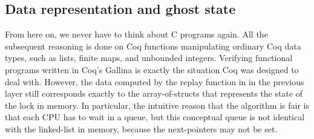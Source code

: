 %
%
%
%
%

\subsection{Data representation and ghost state}
\label{sec:representation-ghost}

From here on, we never have to think about C programs again.  All the
subsequent reasoning is done on Coq functions manipulating ordinary
Coq data types, such as lists, finite maps, and unbounded integers.
Verifying functional programs written in Coq's Gallina is exactly the
situation Coq was designed to deal with. However, the data computed
by the replay function in in the previous layer still corresponds
exactly to the array-of-structs that represents the state of the lock
in memory.
In particular, the intuitive reason that the algorithm is fair is that
each CPU has to wait in a queue, but this conceptual queue is not identical with
the linked-list in memory, because the next-pointers may not be set.

